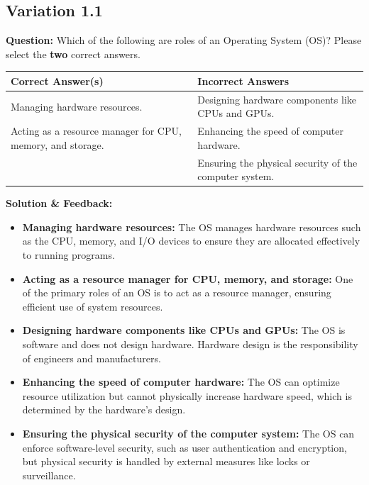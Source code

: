 \subsection{Variation 1.1}
\textbf{Question:} Which of the following are roles of an Operating System (OS)? Please select the \textbf{two} correct answers.\\
\begin{tabularx}{\textwidth}{|X|X|}
    \hline
    \textbf{Correct Answer(s)} & \textbf{Incorrect Answers} \\
    \hline
    Managing hardware resources. & Designing hardware components like CPUs and GPUs. \\
    Acting as a resource manager for CPU, memory, and storage. & Enhancing the speed of computer hardware. \\
        & Ensuring the physical security of the computer system. \\
    \hline
\end{tabularx}
\textbf{Solution \& Feedback:}
\begin{itemize}
    \item \textbf{Managing hardware resources:} The OS manages hardware resources such as the CPU, memory, and I/O devices to ensure they are allocated effectively to running programs.
    \item \textbf{Acting as a resource manager for CPU, memory, and storage:} One of the primary roles of an OS is to act as a resource manager, ensuring efficient use of system resources.
    \item \textbf{Designing hardware components like CPUs and GPUs:} The OS is software and does not design hardware. Hardware design is the responsibility of engineers and manufacturers.
    \item \textbf{Enhancing the speed of computer hardware:} The OS can optimize resource utilization but cannot physically increase hardware speed, which is determined by the hardware's design.
    \item \textbf{Ensuring the physical security of the computer system:} The OS can enforce software-level security, such as user authentication and encryption, but physical security is handled by external measures like locks or surveillance.
\end{itemize}

